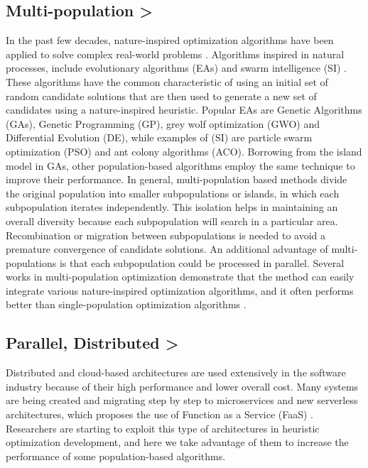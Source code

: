 \documentclass[runningheads]{llncs}
\begin{document}
\subsection{Multi-population >}
In the past few decades, nature-inspired optimization algorithms have been
applied to solve complex real-world problems \cite{yang2014nature}. Algorithms
inspired in natural processes,  include evolutionary algorithms (EAs)
\cite{back1996evolutionary} and swarm intelligence (SI) \cite{kennedy2006swarm}.
These algorithms have the common characteristic of using an initial set of
random candidate solutions that are then used to generate a new set of
candidates using a nature-inspired heuristic. Popular EAs are Genetic Algorithms
(GAs), Genetic Programming (GP), grey wolf optimization (GWO) and Differential
Evolution (DE), while examples of (SI) are particle swarm optimization (PSO) and
ant colony algorithms (ACO). Borrowing from the island model in GAs, other
population-based algorithms employ the same technique to improve their
performance. In general, multi-population based methods divide the original
population into smaller subpopulations or islands, in which each subpopulation
iterates independently. This isolation helps in maintaining an overall diversity
because each subpopulation will search in a particular area. Recombination or
migration between subpopulations is needed to avoid a premature convergence of
candidate solutions. An additional advantage of multi-populations is that each
subpopulation could be processed in parallel. Several works in multi-population
optimization demonstrate \cite{wu2016differential} that the method can easily
integrate various nature-inspired optimization algorithms, and it often performs
better than single-population optimization algorithms \cite{ma2019multi}.


\subsection{Parallel, Distributed >}
Distributed and cloud-based architectures are used extensively in the software
industry because of their high performance and lower overall cost. Many systems
are being created and migrating step by step to microservices and new serverless
architectures, which proposes the use of Function as a Service (FaaS) 
\cite{Hellerstein2018,Everywhere,Baird2016}. 
Researchers are starting to exploit this type of architectures in heuristic optimization
development, and here we take advantage of them to increase the performance of
some population-based algorithms.
\end{document}

